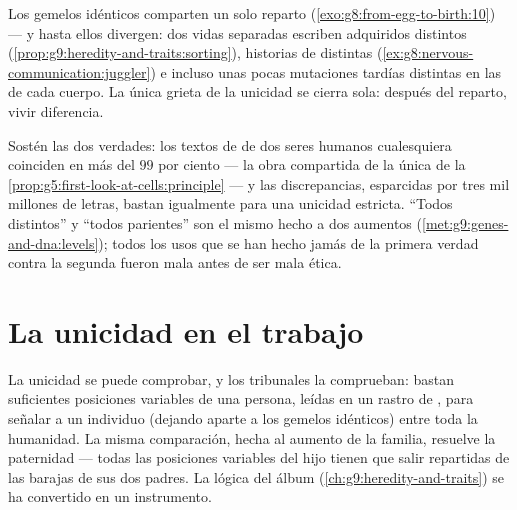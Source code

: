 \begin{example}\label{ex:g9:unique-individuals:twins}
Los gemelos idénticos comparten un solo reparto
(\cref{exo:g8:from-egg-to-birth:10}) --- y hasta ellos divergen: dos
vidas separadas escriben  adquiridos distintos
(\cref{prop:g9:heredity-and-traits:sorting}), historias de 
distintas (\cref{ex:g8:nervous-communication:juggler}) e incluso unas
pocas mutaciones tardías distintas en las  de cada cuerpo. La
única grieta de la unicidad se cierra sola: después del reparto, vivir
diferencia.
\end{example}

\begin{remark}\label{rem:g9:unique-individuals:alike}
Sostén las dos verdades: los textos de  de dos seres humanos
cualesquiera coinciden en más del $99$ por ciento --- la obra
compartida de la única  de la
\cref{prop:g5:first-look-at-cells:principle} --- y las discrepancias,
esparcidas por tres mil millones de letras, bastan igualmente para una
unicidad estricta. ``Todos distintos'' y ``todos parientes'' son el
mismo hecho a dos aumentos
(\cref{met:g9:genes-and-dna:levels}); todos los usos que se han hecho
jamás de la primera verdad contra la segunda fueron mala  antes
de ser mala ética.
\end{remark}

\section{La unicidad en el trabajo}

\begin{example}\label{ex:g9:unique-individuals:forensics}
La unicidad se puede comprobar, y los tribunales la comprueban: bastan
suficientes posiciones variables de una persona, leídas en un rastro de
, para señalar a un individuo (dejando aparte a los gemelos
idénticos) entre toda la humanidad. La misma comparación, hecha al
aumento de la familia, resuelve la paternidad --- todas las posiciones
variables del hijo tienen que salir repartidas de las barajas de sus
dos padres. La lógica del álbum
(\cref{ch:g9:heredity-and-traits}) se ha convertido en un instrumento.
\end{example}


